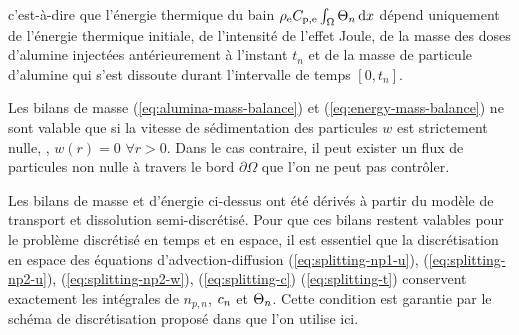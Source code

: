 c'est-à-dire que l'énergie thermique du bain
$\rho_\mathrm{e}C_{\mathrm{p,e}}\int_\Omega\Theta_{n}\,\mathrm dx$
dépend uniquement de l'énergie thermique initiale, de l'intensité de
l'effet Joule, de la masse des doses d'alumine injectées
antérieurement à l'instant $t_n$ et de la masse de particule
d'alumine qui s'est dissoute durant l'intervalle de temps $[0, t_n]$.

\begin{remarque}
  Les bilans de masse (\ref{eq:alumina-mass-balance}) et
  (\ref{eq:energy-mass-balance}) ne sont valable que si la vitesse de
  sédimentation des particules $w$ est strictement nulle, \ie, $w(r) =
  0$ $\forall r > 0$. Dans le cas contraire, il peut exister un flux
  de particules non nulle à travers le bord $\partial \Omega$ que l'on
  ne peut pas contrôler.
\end{remarque}

\begin{remarque}
Les bilans de masse et d'énergie ci-dessus ont été dérivés à partir du
modèle de transport et dissolution semi-discrétisé. Pour que ces
bilans restent valables pour le problème discrétisé en temps et en
espace, il est essentiel que la discrétisation en espace des équations
d'advection-diffusion (\ref{eq:splitting-np1-u}),
(\ref{eq:splitting-np2-u}), (\ref{eq:splitting-np2-w}),
(\ref{eq:splitting-c}) (\ref{eq:splitting-t}) conservent exactement
les intégrales de $n_{p,n}$, $c_n$ et
$\Theta_n$. Cette condition est garantie par le schéma de
discrétisation proposé dans \cite{Hofer2011} que l'on utilise ici.
\end{remarque}
